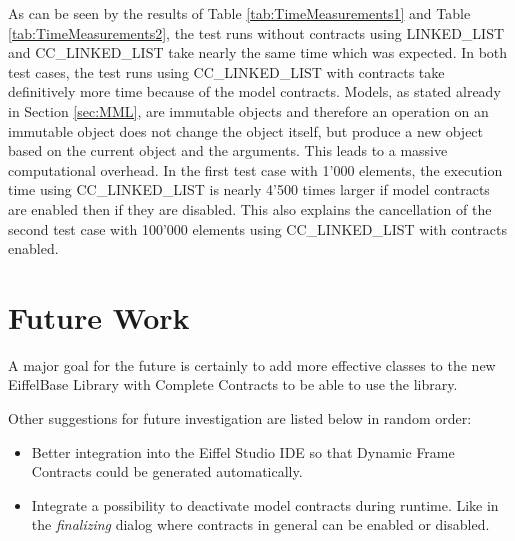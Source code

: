 As can be seen by the results of Table \ref{tab:TimeMeasurements1} and Table \ref{tab:TimeMeasurements2}, the test runs without contracts using LINKED\_LIST and CC\_LINKED\_LIST take nearly the same time which was expected. In both test cases, the test runs using CC\_LINKED\_LIST with contracts take definitively more time because of the model contracts. Models, as stated already in Section \ref{sec:MML}, are immutable objects and therefore an operation on an immutable object does not change the object itself, but produce a new object based on the current object and the arguments. This leads to a massive computational overhead. In the first test case with 1'000 elements, the execution time using CC\_LINKED\_LIST is nearly 4'500 times larger if model contracts are enabled then if they are disabled. This also explains the cancellation of the second test case with 100'000 elements using CC\_LINKED\_LIST with contracts enabled.

\section{Future Work}
\label{sec:FutureWork}

A major goal for the future is certainly to add more effective classes to the new EiffelBase Library with Complete Contracts to be able to use the library.

Other suggestions for future investigation are listed below in random order:
\begin{itemize}
	\item Better integration into the Eiffel Studio IDE so that Dynamic Frame Contracts could be generated automatically.
	\item Integrate a possibility to deactivate model contracts during runtime. Like in the \emph{finalizing} dialog where contracts in general can be enabled or disabled.
\end{itemize}
